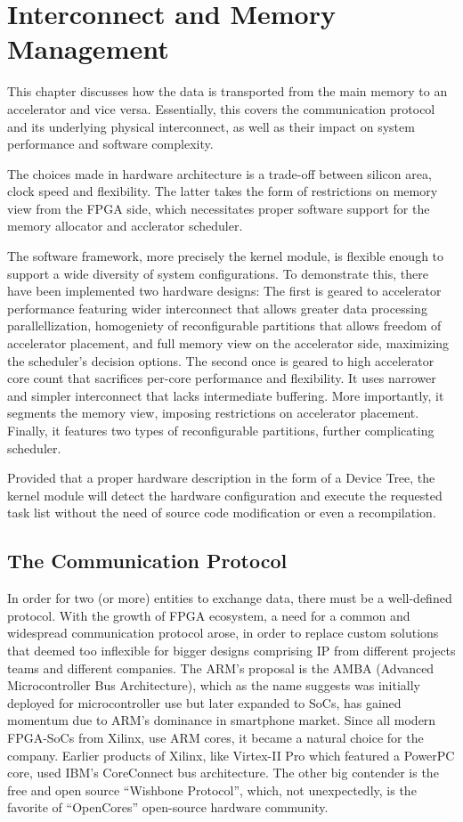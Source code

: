 \chapter{Interconnect and Memory Management}

This chapter discusses how the data is transported from the main memory to an accelerator and vice versa. 
Essentially, this covers the communication protocol and its underlying physical interconnect, as well as their impact on system performance and software complexity.

The choices made in hardware architecture is a trade-off between silicon area, clock speed and flexibility. 
The latter takes the form of restrictions on memory view from the FPGA side, which necessitates proper software support for the memory allocator and acclerator scheduler.

The software framework, more precisely the kernel module,
is flexible enough to support a wide diversity of system configurations. 
To demonstrate this, there have been implemented two hardware designs: 
The first is geared to accelerator performance featuring wider interconnect that allows greater data processing parallellization,
homogeniety of reconfigurable partitions that allows freedom of accelerator placement, 
and full memory view on the accelerator side, maximizing the scheduler's decision options.
The second once is geared to high accelerator core count that sacrifices per-core performance and flexibility. 
It uses narrower and simpler interconnect that lacks intermediate buffering. 
More importantly, it segments the memory view, imposing restrictions on accelerator placement. Finally, it features two types of reconfigurable partitions, further complicating scheduler.

Provided that a proper hardware description in the form of a Device Tree\cite{devicetree}, the kernel module will detect the hardware configuration and execute the requested task list without the need of source code modification or even a recompilation.

\section{The Communication Protocol}
In order for two (or more) entities to exchange data, there must be a well-defined protocol.
With the growth of FPGA ecosystem, a need for a common and widespread communication protocol arose,
in order to replace custom solutions that deemed too inflexible for bigger designs comprising IP 
from different projects teams and different companies.
The ARM's proposal is the AMBA\cite{amba} (Advanced Microcontroller Bus Architecture), 
which as the name suggests was initially deployed for microcontroller use but later expanded to SoCs,
has gained momentum due to ARM's dominance in smartphone market. Since all modern FPGA-SoCs from Xilinx,
use ARM cores, it became a natural choice for the company. Earlier products of Xilinx, like Virtex-II Pro which
featured a PowerPC core, used IBM's CoreConnect bus architecture. 
The other big contender is the free and open source ``Wishbone Protocol'', 
which, not unexpectedly, is the favorite of ``OpenCores'' open-source hardware community.

